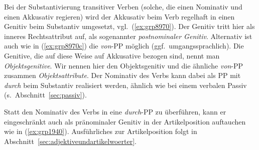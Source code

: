 \begin{exe}
  \ex\label{ex:grp1479}
  \begin{xlist}
  \end{xlist}
\end{exe}


Bei der Substantivierung transitiver Verben (solche, die einen Nominativ und einen Akkusativ regieren) wird der Akkusativ beim Verb regelhaft in einen Genitiv beim Substantiv umgesetzt, vgl.\ (\ref{ex:grp8970}).
Der Genitiv tritt hier als inneres Rechtsattribut auf, als sogenannter \textit{postnominaler Genitiv}.
Alternativ ist auch wie in (\ref{ex:grp8970c}) die \textit{von}-PP möglich (ggf.\ umgangssprachlich).
Die Genitive, die auf diese Weise auf Akkusative bezogen sind, nennt man \textit{Objektsgenitive}.
Wir nennen hier den Objektsgenitiv und die ähnliche \textit{von}-PP zusammen \textit{Objektsattribute}.
Der Nominativ des Verbs kann dabei als PP mit \textit{durch} beim Substantiv realisiert werden, ähnlich wie bei einem verbalen Passiv (s.\ Abschnitt~\ref{sec:passiv}).

\begin{exe}
  \ex\label{ex:grp8970}
  \begin{xlist}
  \end{xlist}
\end{exe}


Statt den Nominativ des Verbs in eine \textit{durch}-PP zu überführen, kann er eingeschränkt auch als pränominaler Genitiv in der Artikelposition auftauchen wie in (\ref{ex:grp1940}).
Ausführliches zur Artikelposition folgt in Abschnitt~\ref{sec:adjektiveundartikelwoerter}.

\begin{exe}
  \ex\label{ex:grp1940}
  \begin{xlist}
  \end{xlist}
\end{exe}

